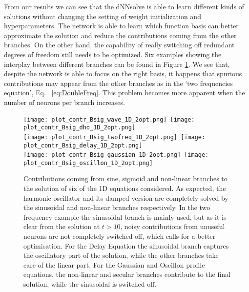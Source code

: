 \documentclass{article}
\begin{document}
From our results we can see that the \textsf{dNNsolve} is able to learn different kinds of solutions without changing the setting of weight initialization and hyperparameters. The network is able to learn which function basis can better approximate the solution and reduce the contributions coming from the other branches. On the other hand, the capability of really switching off redundant degrees of freedom still needs to be optimized. Six examples showing the interplay between different branches can be found in Figure \ref{fig:branches}. We see that, despite the network is able to focus on the right basis, it happens that spurious contributions may appear from the other branches as in the ‘two frequencies equation’, Eq.~ \ref{eq:DoubleFreq}. This problem becomes more apparent when the number of neurons per branch increases.
\begin{figure}[t!]
\begin{center}
 \texttt{[image: plot\_contr\_Bsig\_wave\_1D\_2opt.png]}\,
  \texttt{[image: plot\_contr\_Bsig\_dho\_1D\_2opt.png]}\\ \texttt{[image: plot\_contr\_Bsig\_twofreq\_1D\_2opt.png]}\, \texttt{[image: plot\_contr\_Bsig\_delay\_1D\_2opt.png]}\\
   \texttt{[image: plot\_contr\_Bsig\_gaussian\_1D\_2opt.png]}\, \texttt{[image: plot\_contr\_Bsig\_oscillon\_1D\_2opt.png]}\\
  \caption{Contributions coming from sine, sigmoid and non-linear branches to the solution of six of the 1D equations considered. As expected, the harmonic oscillator and its damped version are completely solved by the sinusoidal and non-linear branches respectively. In the two frequency example the sinusoidal branch is mainly used, but as it is clear from the solution at $t > 10$, noisy contributions from unuseful neurons are not completely switched off, which calls for a better optimisation. For the Delay Equation the sinusoidal branch captures the oscillatory part of the solution, while the other branches take care of the linear part. For the Gaussian and Oscillon profile equations, the non-linear and secular branches contribute to the final solution, while the sinusoidal is switched off.}
  \label{fig:branches}
  \end{center}
\end{figure}
\end{document}

